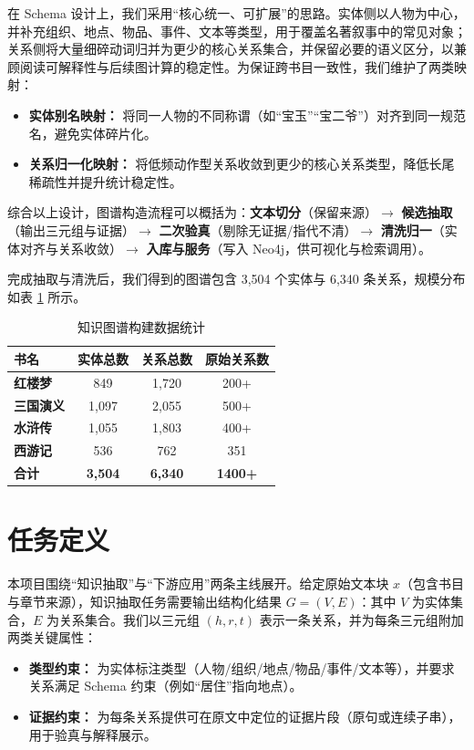 \documentclass[lang=cn,a4paper,newtx,code=minted]{elegantpaper}
\begin{document}
在 Schema 设计上，我们采用“核心统一、可扩展”的思路。实体侧以人物为中心，并补充组织、地点、物品、事件、文本等类型，用于覆盖名著叙事中的常见对象；关系侧将大量细碎动词归并为更少的核心关系集合，并保留必要的语义区分，以兼顾阅读可解释性与后续图计算的稳定性。为保证跨书目一致性，我们维护了两类映射：
\begin{itemize}
    \item \textbf{实体别名映射：} 将同一人物的不同称谓（如“宝玉”“宝二爷”）对齐到同一规范名，避免实体碎片化。
    \item \textbf{关系归一化映射：} 将低频动作型关系收敛到更少的核心关系类型，降低长尾稀疏性并提升统计稳定性。
\end{itemize}

综合以上设计，图谱构造流程可以概括为：\textbf{文本切分}（保留来源）$\rightarrow$ \textbf{候选抽取}（输出三元组与证据）$\rightarrow$ \textbf{二次验真}（剔除无证据/指代不清）$\rightarrow$ \textbf{清洗归一}（实体对齐与关系收敛）$\rightarrow$ \textbf{入库与服务}（写入 Neo4j，供可视化与检索调用）。

完成抽取与清洗后，我们得到的图谱包含 3,504 个实体与 6,340 条关系，规模分布如表 \ref{tab:kg_stats} 所示。

\begin{table}[htbp]
    \centering
    \caption{知识图谱构建数据统计}
    \label{tab:kg_stats}
    \begin{tabular}{lccc}
        \hline
        \textbf{书名} & \textbf{实体总数} & \textbf{关系总数} & \textbf{原始关系数} \\
        \hline
        \textbf{红楼梦} & 849 & 1,720 & 200+ \\
        \textbf{三国演义} & 1,097 & 2,055 & 500+ \\
        \textbf{水浒传} & 1,055 & 1,803 & 400+ \\
        \textbf{西游记} & 536 & 762 & 351 \\
        \hline
        \textbf{合计} & \textbf{3,504} & \textbf{6,340} & \textbf{1400+} \\
        \hline
    \end{tabular}
\end{table}

\section{任务定义}

本项目围绕“知识抽取”与“下游应用”两条主线展开。给定原始文本块 $x$（包含书目与章节来源），知识抽取任务需要输出结构化结果 $G=(V,E)$：其中 $V$ 为实体集合，$E$ 为关系集合。我们以三元组 $(h,r,t)$ 表示一条关系，并为每条三元组附加两类关键属性：
\begin{itemize}
    \item \textbf{类型约束：} 为实体标注类型（人物/组织/地点/物品/事件/文本等），并要求关系满足 Schema 约束（例如“居住”指向地点）。
    \item \textbf{证据约束：} 为每条关系提供可在原文中定位的证据片段（原句或连续子串），用于验真与解释展示。
\end{itemize}
\end{document}
